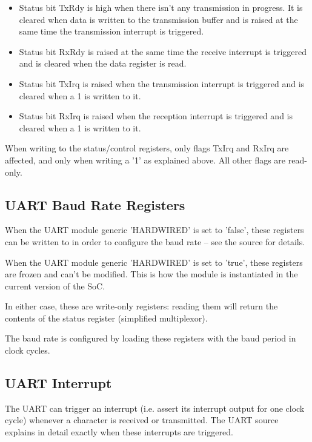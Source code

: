     \begin{itemize}
    \item Status bit TxRdy is high when there isn't any transmission in progress. 
            It is cleared when data is written to the transmission buffer and is 
            raised at the same time the transmission interrupt is triggered.
    \item Status bit RxRdy is raised at the same time the receive interrupt is
            triggered and is cleared when the data register is read.
    \item Status bit TxIrq is raised when the transmission interrupt is triggered 
            and is cleared when a 1 is written to it.
    \item Status bit RxIrq is raised when the reception interrupt is triggered 
            and is cleared when a 1 is written to it.
    \end{itemize}
    
    When writing to the status/control registers, only flags TxIrq and RxIrq are
    affected, and only when writing a '1' as explained above. All other flags 
    are read-only.

    
\subsection{UART Baud Rate Registers}
\label{soc_uart_baud_regs}    
    
    When the UART module generic 'HARDWIRED' is set to 'false', these registers
    can be written to in order to configure the baud rate -- see the source for 
    details.
    
    When the UART module generic 'HARDWIRED' is set to 'true', these registers
    are frozen and can't be modified. This is how the module is instantiated in 
    the current version of the SoC.
    
    In either case, these are write-only registers: reading them will return 
    the contents of the status register (simplified multiplexor).
    
    The baud rate is configured by loading these registers with the baud period
    in clock cycles.
   
    
\subsection{UART Interrupt}
\label{soc_uart_interrupts}    
    
    The UART can trigger an interrupt (i.e. assert its interrupt output for one 
    clock cycle) whenever a character is received or transmitted. The UART
    source explains in detail exactly when these interrupts are triggered.
    
